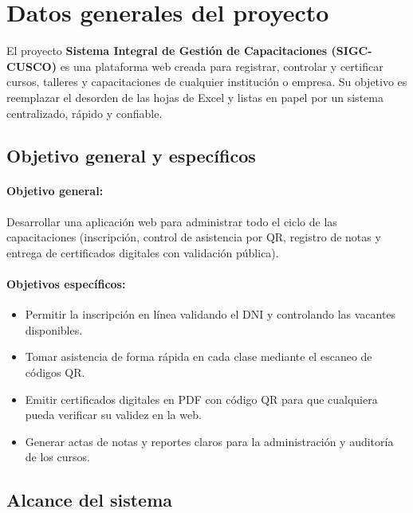 \section{Datos generales del proyecto}

El proyecto \textbf{Sistema Integral de Gestión de Capacitaciones (SIGC-CUSCO)} es una plataforma web creada para registrar, controlar y certificar cursos, talleres y capacitaciones de cualquier institución o empresa. Su objetivo es reemplazar el desorden de las hojas de Excel y listas en papel por un sistema centralizado, rápido y confiable.

\subsection{Objetivo general y específicos}

\paragraph{Objetivo general:}
Desarrollar una aplicación web para administrar todo el ciclo de las capacitaciones (inscripción, control de asistencia por QR, registro de notas y entrega de certificados digitales con validación pública).

\paragraph{Objetivos específicos:}
\begin{itemize}[nosep]
    \item Permitir la inscripción en línea validando el DNI y controlando las vacantes disponibles.
    \item Tomar asistencia de forma rápida en cada clase mediante el escaneo de códigos QR.
    \item Emitir certificados digitales en PDF con código QR para que cualquiera pueda verificar su validez en la web.
    \item Generar actas de notas y reportes claros para la administración y auditoría de los cursos.
\end{itemize}

\subsection{Alcance del sistema}

